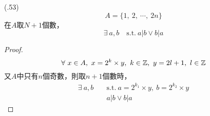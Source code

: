 \item \begin{theorem}{(.53)} \begin{equation}
        A = \{1, \ 2, \ \cdots, \ 2n\}
    \end{equation} 在$A$取$N + 1$個數，\begin{equation}
        \exists \ a, b \quad \text{s.t.} \ a | b \lor b | a
    \end{equation}
    \begin{proof}
        \begin{equation}
            \forall \ x \in A, \ x = 2^k \times y, \ k \in \mathbb{Z}, \ y = 2l + 1, \ l \in \mathbb{Z}
        \end{equation} 又$A$中只有$n$個奇數，則取$n + 1$個數時， \begin{equation}
            \begin{aligned}
                \exists \ a, b \quad & \text{s.t.} \ a = 2^{k_1} \times y, \ b = 2^{k_2} \times y \\
                & a | b \lor b | a
            \end{aligned}
        \end{equation}
    \end{proof}
\end{theorem}